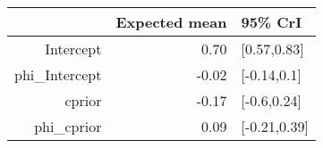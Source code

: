 \begin{tabular}{rrl}
  \hline
 & Expected mean & 95\% CrI \\ 
  \hline
Intercept & 0.70 & [0.57,0.83] \\ 
  phi\_Intercept & -0.02 & [-0.14,0.1] \\ 
  cprior & -0.17 & [-0.6,0.24] \\ 
  phi\_cprior & 0.09 & [-0.21,0.39] \\ 
   \hline
\end{tabular}

